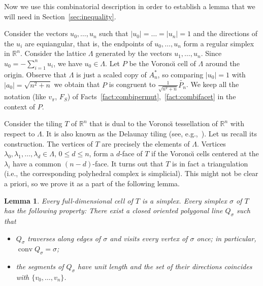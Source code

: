 \documentclass[12pt,a4paper,oneside]{amsart}
\newtheorem{lemma}[theorem]{Lemma}
\theoremstyle{definition}
\theoremstyle{remark}
\numberwithin{equation}{section}
\DeclareMathOperator{\conv}{conv}
\begin{document}
Now we use this combinatorial description in order to establish a lemma that we will need in Section~\ref{sec:inequality}.

Consider the vectors $u_0, \ldots, u_n$ such that $|u_0| = \ldots = |u_n| = 1$ and the directions of the $u_i$ are equiangular, that is, the endpoints of $u_0, \ldots, u_n$ form a regular simplex in $\mathbb{R}^n$. Consider the lattice $\Lambda$ generated by the vectors $u_1, \ldots, u_n$. Since $u_0 = -\sum\limits_{i=1}^n u_i$, we have $u_0 \in \Lambda$. Let $P$ be the Vorono\u{\i} cell of $\Lambda$ around the origin. Observe that $\Lambda$ is just a scaled copy of $A_n^*$, so comparing $|u_0| = 1$ with $|a_0| = \sqrt{n^2+n}$ we obtain that $P$ is congruent to $\frac{1}{\sqrt{n^2+n}} \widetilde{P_n}$. We keep all the notation (like $v_\pi$, $F_S$) of Facts~\ref{fact:combipermut},~\ref{fact:combifacet} in the context of $P$.

Consider the tiling $T$ of $\mathbb{R}^n$ that is dual to the Vorono\u{\i} tessellation of $\mathbb{R}^n$ with respect to $\Lambda$. It is also known as the Delaunay tiling (see, e.g.,~\cite[Chapter~32]{gruber2007convex}). Let us recall its construction. The vertices of $T$ are precisely the elements of $\Lambda$. Vertices $\lambda_0, \lambda_1, \ldots, \lambda_d \in \Lambda$, $0 \le d \le n$, form a $d$-face of $T$ if the Vorono\u{\i} cells centered at the $\lambda_i$ have a common $(n-d)$-face.
It turns out that $T$ is in fact a triangulation (i.e., the corresponding polyhedral complex is simplicial). This might not be clear a priori, so we prove it as a part of the following lemma.



\begin{lemma}
\label{lem:equiedge}
Every full-dimensional cell of $T$ is a simplex. Every simplex $\sigma$ of $T$ has the following property: There exist a closed oriented polygonal line $Q_\sigma$ such that
\begin{itemize}
\item $Q_\sigma$ traverses along edges of $\sigma$ and visits every vertex of $\sigma$ once; in particular, $\conv Q_\sigma = \sigma$;
\item the segments of $Q_\sigma$ have unit length and the set of their directions coincides with $\{v_0, \ldots, v_n\}$.
\end{itemize}

\end{lemma}
\end{document}
